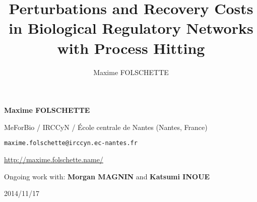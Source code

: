 \documentclass[fleqn,8pt,c]{beamer}
\date{\thedate}
\title[Perturbations and Recovery Costs in BRNs with PH]%
  {Perturbations and Recovery Costs in Biological Regulatory Networks with Process Hitting}
\author{Maxime FOLSCHETTE}
\newcommand{\ex}[1]{\textcolor{couleurex}{#1}}
\newcommand{\tcite}[1]{\textcolor{couleurcit}{[#1]}}
\newcommand{\tval}[1]{\textbf{#1}}
\newcommand{\thedate}{2014/11/17}
\begin{document}
\begin{frame}[plain,label=title]

\begin{center}
\vfill
\textcolor{couleurtheme}{}

\par
\medskip
\bigskip
\normalsize
\tval{Maxime FOLSCHETTE}

\medskip
\footnotesize
MeForBio / IRCCyN / École centrale de Nantes (Nantes, France)

\texttt{maxime.folschette@irccyn.ec-nantes.fr}

\url{http://maxime.folschette.name/}

\bigskip

Ongoing work with: \tval{Morgan MAGNIN} and \tval{Katsumi INOUE}

\bigskip

\normalsize
\thedate
\end{center}

\scriptsize
\bigskip


\vfill

\end{frame}





\newcommand{\cmodels}{\bigskip
\quad\tval{\ex{egfr20}} : Epithelial Growth Factor Receptor (20 components) \tcite{Sahin \textit{et al.}, 2009}\\
\quad\tval{\ex{egfr104}} : Epithelial Growth Factor Receptor (104 components) \tcite{Samaga \textit{et al.}, 2009}\\
\quad\tval{\ex{tcrsig40}} : T-Cell Receptor (40 composants) \tcite{Klamt \textit{et al.}, 2006}\\
\quad\tval{\ex{tcrsig94}} : T-Cell Receptor (94 composants) \tcite{Saez-Rodriguez \textit{et al.}, 2007}\\}
\end{document}
